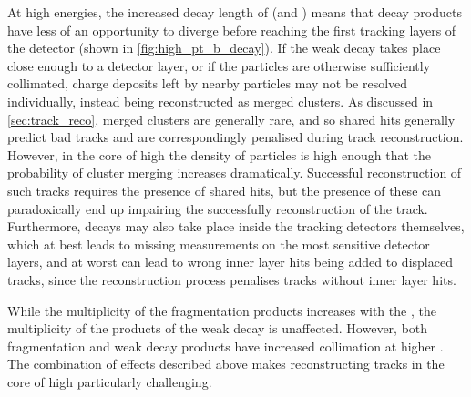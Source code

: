 At high energies, the increased decay length of \bhadrons (and \chadrons) means that decay products have less of an opportunity to diverge before reaching the first tracking layers of the detector (shown in \cref{fig:high_pt_b_decay}).
If the weak decay takes place close enough to a detector layer, or if the particles are otherwise sufficiently collimated, charge deposits left by nearby particles may not be resolved individually, instead being reconstructed as merged clusters.
As discussed in \cref{sec:track_reco}, merged clusters are generally rare, and so shared hits generally predict bad tracks and are correspondingly penalised during track reconstruction.
However, in the core of high \pT \bjets the density of particles is high enough that the probability of cluster merging increases dramatically.
Successful reconstruction of such tracks requires the presence of shared hits, but the presence of these can paradoxically end up impairing the successfully reconstruction of the track.
Furthermore, decays may also take place inside the tracking detectors themselves, which at best leads to missing measurements on the most sensitive detector layers, and at worst can lead to wrong inner layer hits being added to displaced tracks, since the reconstruction process penalises tracks without inner layer hits.

While the multiplicity of the fragmentation products increases with the \bhadron \pt, the  multiplicity of the products of the weak decay is unaffected.
However, both fragmentation and weak decay products have increased collimation at higher \pT.
The combination of effects described above makes reconstructing tracks in the core of high \pT \bjets particularly challenging.

